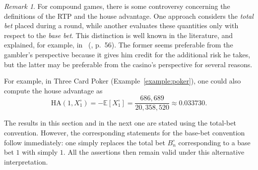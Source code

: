 \documentclass{article}
\theoremstyle{definition}
\theoremstyle{remark}
\newtheorem{remark}[theorem]{Remark}
\newcommand{\E}{\mathbb{E}}
\newcommand{\HA}{\mathrm{HA}}
\begin{document}
\begin{remark}
For compound games, there is some controversy concerning the definitions of the RTP and the house advantage.  
One approach considers the \textit{total bet} placed during a round, while another evaluates these quantities only with respect to the \textit{base bet}.  
This distinction is well known in the literature, and explained, for example, in~\citeauthor{HC05} (\citeyear{HC05}, p.~56).
The former seems preferable from the gambler's perspective because it gives him credit for the additional risk he takes, but the latter may be preferable from the casino's perspective for several reasons.

For example, in Three Card Poker (Example~\ref{example:poker}), one could also compute the house advantage as 
\[
\HA(1,X_1^\circ)=-\E[X_1^\circ]=\frac{686{,}689}{20{,}358{,}520}\approx0.033730.
\]

The results in this section and in the next one are stated using the total-bet convention.  
However, the corresponding statements for the base-bet convention follow immediately: one simply replaces the total bet $B_{n}^{\circ}$ corresponding to a base bet $1$ with simply $1$. All the assertions then remain valid under this alternative interpretation.
\end{remark}
\end{document}
